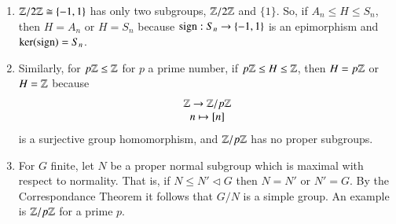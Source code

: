 \begin{example}
        \leavevmode
        \begin{enumerate}
                \item $\mathbb Z/2\mathbb Z \cong \{-1,1\}$ has only two subgroups, $\mathbb Z/2\mathbb Z$ and $\{1\}$. So, if $A_n \leq H \leq S_n$, then $H = A_n$ or $H = S_n$ because $\operatorname{sign}:S_n\rightarrow \{-1,1\}$ is an epimorphism and $\ker(\operatorname{sign}) = S_n$.
                \item Similarly, for $p\mathbb Z\leq \mathbb Z$ for $p$ a prime number, if $p\mathbb Z \leq H \leq \mathbb Z$, then $H = p\mathbb Z$ or $H = \mathbb Z$ because \begin{equation}
                                \begin{array}{c} \mathbb Z\rightarrow \mathbb Z/p\mathbb Z \\ n\mapsto {[n]} \end{array}
                \end{equation}
                        is a surjective group homomorphism, and $\mathbb Z/p\mathbb Z$ has no proper subgroups.
                \item For $G$ finite, let $N$ be a proper normal subgroup which is maximal with respect to normality. That is, if $N \leq N' \vartriangleleft G$ then $N = N'$ or $N' = G$. By the Correspondance Theorem it follows that $G/N$ is a simple group. An example is $\mathbb Z/p\mathbb Z$ for a prime $p$.
        \end{enumerate}
\end{example}

